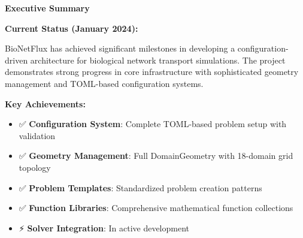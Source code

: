 \documentclass[11pt,a4paper]{article}
\begin{document}
\restoregeometry

\thispagestyle{empty}
\vspace*{\fill}

\begin{center}
{\Huge \textbf{Executive Summary}}\\[2cm]
\end{center}



\vskip1cm

\begin{progressbox}
\textbf{Current Status (January 2024):}

BioNetFlux has achieved significant milestones in developing a configuration-driven architecture for biological network transport simulations. The project demonstrates strong progress in core infrastructure with sophisticated geometry management and TOML-based configuration systems.

\textbf{Key Achievements:}
\begin{itemize}
    \item ✅ \textbf{Configuration System}: Complete TOML-based problem setup with validation
    \item ✅ \textbf{Geometry Management}: Full DomainGeometry with 18-domain grid topology
    \item ✅ \textbf{Problem Templates}: Standardized problem creation patterns
    \item ✅ \textbf{Function Libraries}: Comprehensive mathematical function collections
    \item ⚡ \textbf{Solver Integration}: In active development
\end{itemize}

\begin{center}
\end{center}


\end{progressbox}
\end{document}
